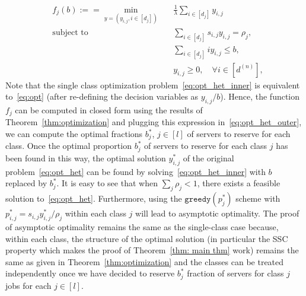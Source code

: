 \documentclass[a4paper]{article}
\theoremstyle{plain}
\theoremstyle{definition}
\theoremstyle{case}
\theoremstyle{remark}
\begin{document}
\begin{equation}
        \begin{aligned}
        & f_j(b):==\underset{y=(y_{i,j}, i\in [d_j])}{\min}
        & & \frac{1}{\lambda}\sum_{i\in [d_j]} y_{i,j}\\
        & \text{subject to}
        & & \sum_{i \in [d_j]} s_{i,j} y_{i,j} = \rho_j, \\
        & & &\sum_{i\in [d_j]} i y_{i,j} \leq b,\\
        & & &  y_{i,j} \geq 0, \quad \forall i \in [d^{(n)}],
        \end{aligned}
        \tag{Q2}
    \label{eq:opt_het_inner}
\end{equation}
%
Note that the single class optimization problem~\eqref{eq:opt_het_inner}  is equivalent to~\eqref{eq:opt} (after re-defining the decision variables as $y_{i,j}/b$). Hence, the function $f_j$ can be computed in closed form using the results of Theorem~\ref{thm:optimization} and plugging this expression in~\eqref{eq:opt_het_outer}, we can compute the optimal fractions $b_j^*$, $j \in [l]$ of servers to reserve for each class. Once the optimal proportion $b_j^*$ of servers to reserve for each class $j$ has been found in this way, the optimal solution $y_{i,j}^*$ of the original problem~\eqref{eq:opt_het} can be found by solving~\eqref{eq:opt_het_inner} with $b$ replaced by $b_j^*$. It is easy to see that when $\sum_j \rho_j < 1$, there exists a feasible solution to~\eqref{eq:opt_het}. Furthermore, using the $\texttt{greedy}(p_j^*)$ scheme with $p_{i,j}^*=s_{i,j}y_{i,j}^*/\rho_j$ within each class $j$ will lead to asymptotic optimality.  The proof of asymptotic optimality remains the same as the single-class case because,  within each class, the structure of the optimal solution (in particular the SSC property which makes the proof of Theorem~\ref{thm: main thm} work) remains the same as given in Theorem~\ref{thm:optimization} and the classes can be treated independently once we have decided to reserve $b_j^*$ fraction of servers for class $j$ jobs for each $j \in [l]$.
\end{document}

